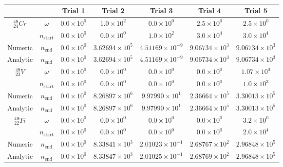 \begin{table}[h]
\begin{center}
\begin{longtable}{c c c c c c c}
\hline\hline
 &  & Trial 1 & Trial 2 & Trial 3 & Trial 4 & Trial 5 \\
\hline\hline
${}^{49}_{24}Cr$ & $\omega$ & 
${0.0} \times 10^{0}$ & ${1.0} \times 10^{2}$ & ${0.0} \times 10^{0}$ &
${2.5} \times 10^{0}$ & ${2.5} \times 10^{0}$ \\
 & $n_{\text{start}}$ & 
${0.0} \times 10^{0}$ & ${0.0} \times 10^{0}$ & ${1.0} \times 10^{2}$ & 
${3.0} \times 10^{4}$ & ${3.0} \times 10^{4}$ \\
Numeric & $n_{\text{end}}$ & 
${0.0} \times 10^{0}$ & ${3.62694} \times 10^{5}$ & ${4.51169} \times 10^{-9}$ & 
${9.06734} \times 10^{3}$ & ${9.06734} \times 10^{3}$ \\
Analytic & $n_{\text{end}}$ & 
${0.0} \times 10^{0}$ & ${3.62694} \times 10^{5}$ & ${4.51169} \times 10^{-9}$ & 
${9.06734} \times 10^{3}$ & ${9.06734} \times 10^{3}$ \\
\hline
${}^{49}_{23}V$ & $\omega$ & 
${0.0} \times 10^{0}$ & ${0.0} \times 10^{0}$ & ${0.0} \times 10^{0}$ &
${0.0} \times 10^{0}$ & ${1.07} \times 10^{0}$ \\
 & $n_{\text{start}}$ & 
${0.0} \times 10^{0}$ & ${0.0} \times 10^{0}$ & ${0.0} \times 10^{0}$ &
${0.0} \times 10^{0}$ & ${1.0} \times 10^{3}$ \\
Numeric & $n_{\text{end}}$ & 
${0.0} \times 10^{0}$ & ${8.26897} \times 10^{6}$ & ${9.97990} \times 10^{1}$ & 
${2.36664} \times 10^{5}$ & ${3.30013} \times 10^{5}$ \\
Analytic & $n_{\text{end}}$ & 
${0.0} \times 10^{0}$ & ${8.26897} \times 10^{6}$ & ${9.97990} \times 10^{1}$ & 
${2.36664} \times 10^{5}$ & ${3.30013} \times 10^{5}$ \\
\hline
${}^{49}_{22}Ti$ & $\omega$ & 
${0.0} \times 10^{0}$ & ${0.0} \times 10^{0}$ & ${0.0} \times 10^{0}$ &
${0.0} \times 10^{0}$ & ${3.2} \times 10^{0}$ \\
 & $n_{\text{start}}$ & 
${0.0} \times 10^{0}$ & ${0.0} \times 10^{0}$ & ${0.0} \times 10^{0}$ &
${0.0} \times 10^{0}$ & ${2.0} \times 10^{4}$ \\
Numeric & $n_{\text{end}}$ & 
${0.0} \times 10^{0}$ & ${8.33841} \times 10^{3}$ & ${2.01023} \times 10^{-1}$ & 
${2.68767} \times 10^{2}$ & ${2.96848} \times 10^{5}$ \\
Analytic & $n_{\text{end}}$ & 
${0.0} \times 10^{0}$ & ${8.33847} \times 10^{3}$ & ${2.01025} \times 10^{-1}$ & 
${2.68769} \times 10^{2}$ & ${2.96848} \times 10^{5}$ \\
\hline\hline
\end{longtable}
\end{center}
\caption{}
\label{table:cr49trialdata}
\end{table}



